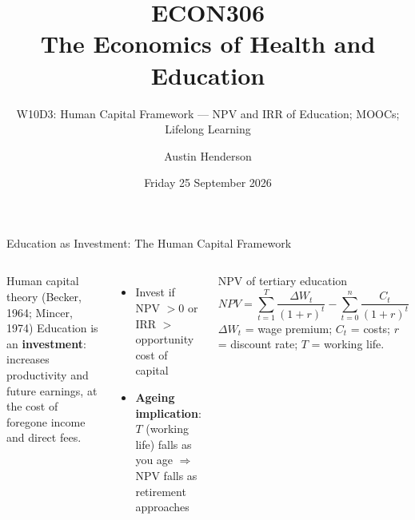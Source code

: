 \documentclass[aspectratio=169, 12pt]{beamer}
\title[ECON306: W10D3 — Human Capital, NPV, IRR]{ECON306\\The Economics of Health and Education}
\subtitle{W10D3: Human Capital Framework --- NPV and IRR of Education; MOOCs; Lifelong Learning}
\author{Austin Henderson}
\institute{Department of Economics\\University of Otago}
\date{Friday 25 September 2026}
\begin{document}
\begin{frame}[plain]
  \titlepage
\end{frame}



\begin{frame}{Education as Investment: The Human Capital Framework}
  \begin{columns}
      \begin{block}{Human capital theory (Becker, 1964; Mincer, 1974)}
        \small Education is an \textbf{investment}: increases productivity and future
        earnings, at the cost of foregone income and direct fees.
      \end{block}
      \footnotesize
      \begin{itemize}
        \item Invest if NPV $> 0$ or IRR $>$ opportunity cost of capital
        \item \textbf{Ageing implication}: $T$ (working life) falls as you age $\Rightarrow$
              NPV falls as retirement approaches
      \end{itemize}
      \begin{block}{NPV of tertiary education}
        \footnotesize
        \[NPV = \sum_{t=1}^{T} \frac{\Delta W_t}{(1+r)^t} - \sum_{t=0}^{n} \frac{C_t}{(1+r)^t}\]
        $\Delta W_t$ = wage premium; $C_t$ = costs; $r$ = discount rate; $T$ = working life.
      \end{block}
  \end{columns}
\end{frame}
\end{document}
